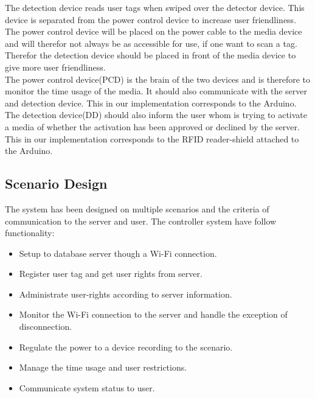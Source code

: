 The detection device reads user tags when swiped over the detector device. This device is separated from the power control device to increase user friendliness.\\
The power control device will be placed on the power cable to the media device and will therefor not always be as accessible for use, if one want to scan a tag. Therefor the detection device should be placed in front of the media device to give more user friendliness.\\
The power control device(PCD) is the brain of the two devices and is therefore to monitor the time usage of the media. It should also communicate with the server and detection device. This in our implementation corresponds to the Arduino.\\
The detection device(DD) should also inform the user whom is trying to activate a media of whether the activation has been approved or declined by the server. This in our implementation corresponds to the RFID reader-shield attached to the Arduino.

\subsection{Scenario Design}
\label{subsec:senarioD}

The system has been designed on multiple scenarios and the criteria of communication to the server and user. 
The controller system have follow functionality: 

\begin{itemize}	
	\item Setup to database server though a Wi-Fi connection. 
	\item Register user tag and get user rights from server. 
	\item Administrate user-rights according to server information.
	\item Monitor the Wi-Fi connection to the server and handle the exception of disconnection. 
	\item Regulate the power to a device recording to the scenario.
	\item Manage the time usage and user restrictions.
	\item Communicate system status to user.
\end{itemize}

